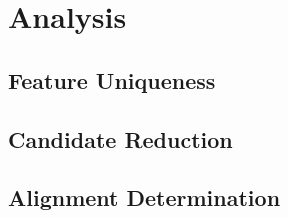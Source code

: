 \section{Analysis}\label{sec:analysis}

\subsection{Feature Uniqueness}\label{subsec:featureUniquenessAnalysis}

\subsection{Candidate Reduction}\label{subsec:candidateReductionAnalysis}

\subsection{Alignment Determination}\label{subsec:alignmentDeterminationAnalysis}